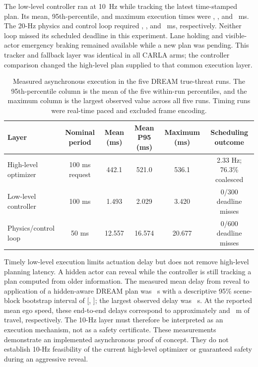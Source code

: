 The low-level controller ran at 10~Hz while tracking the latest time-stamped
plan.  Its mean, 95th-percentile, and maximum execution times were
\CarlaLowLevelMeanMs, \CarlaLowLevelPNinetyFiveMs, and \CarlaLowLevelMaxMs~ms.  The
20-Hz physics and control loop required \CarlaPhysicsMeanMs,
\CarlaPhysicsPNinetyFiveMs, and \CarlaPhysicsMaxMs~ms, respectively.  Neither loop
missed its scheduled deadline in this experiment.  Lane holding and
visible-actor emergency braking remained available while a new plan was
pending.  This tracker and fallback layer was identical in all CARLA arms;
the controller comparison changed the high-level plan supplied to that common
execution layer.

\begin{table}[t]
\centering
\caption{Measured asynchronous execution in the five DREAM true-threat runs.
The 95th-percentile column is the mean of the five within-run percentiles, and
the maximum column is the largest observed value across all five runs.  Timing
runs were real-time paced and excluded frame encoding.}
\label{tab:carla-asynchronous-runtime}
\small
\begin{tabular}{lccccc}
\toprule
Layer & Nominal period & Mean (ms) & Mean P95 (ms) & Maximum (ms) & Scheduling outcome \\
\midrule
High-level optimizer & 100 ms request & 442.1 & 521.0 & 536.1 & 2.33 Hz; 76.3\% coalesced \\
Low-level controller & 100 ms & 1.493 & 2.029 & 3.420 & 0/300 deadline misses \\
Physics/control loop & 50 ms & 12.557 & 16.574 & 20.677 & 0/600 deadline misses \\
\bottomrule
\end{tabular}
\end{table}

Timely low-level execution limits actuation delay but does not remove
high-level planning latency.  A hidden actor can reveal while the controller
is still tracking a plan computed from older information.  The measured mean
delay from reveal to application of a hidden-aware DREAM plan was
\CarlaRevealPlanDelayMeanS~s
with a descriptive 95\% scene-block bootstrap interval of
[\CarlaRevealPlanDelayLowS, \CarlaRevealPlanDelayHighS]; the largest observed
delay was \CarlaRevealPlanDelayMaxS~s.  At the reported mean ego
speed, these end-to-end delays correspond to approximately
\CarlaRevealPlanTravelMeanM{} and \CarlaRevealPlanTravelMaxM{}~m of travel,
respectively.  The 10-Hz layer must
therefore be interpreted as an execution mechanism, not as a safety
certificate.  These measurements demonstrate an implemented asynchronous
proof of concept.  They do not establish 10-Hz feasibility of the current
high-level optimizer or guaranteed safety during an aggressive reveal.
